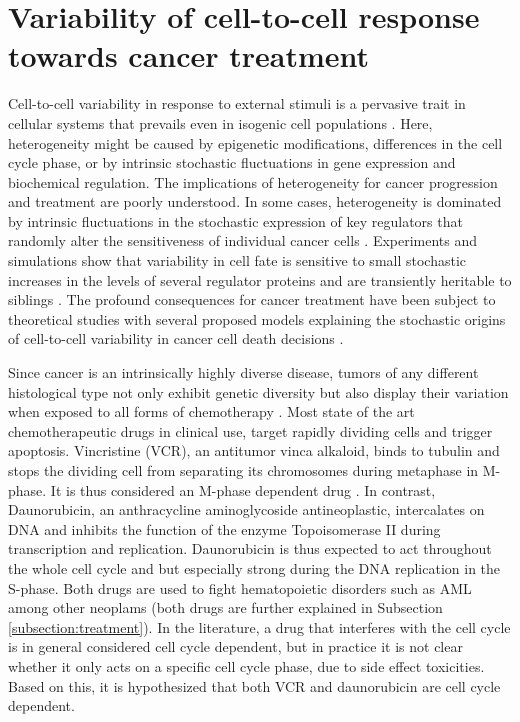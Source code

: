 \documentclass[pdftex,12pt,a4paper]{report}
\begin{document}
\section{Variability of cell-to-cell response towards cancer treatment}

Cell-to-cell variability in response to external stimuli is a pervasive trait in cellular systems that prevails even in isogenic cell populations \cite{snijder2011origins}. Here, heterogeneity might be caused by epigenetic modifications, differences in the cell cycle phase, or by intrinsic stochastic fluctuations in gene expression and biochemical regulation. The implications of heterogeneity for cancer progression and treatment are poorly understood. In some cases, heterogeneity is dominated by intrinsic fluctuations in the stochastic expression of key regulators that randomly alter the sensitiveness of individual cancer cells \cite{spencer2009non}. Experiments and simulations show that variability in cell fate is sensitive to small stochastic increases in the levels of several regulator proteins and are transiently heritable to siblings \cite{bertaux2014modeling, gaudet2012exploring}. The profound consequences for cancer treatment have been subject to theoretical studies with several proposed models explaining the stochastic origins of cell-to-cell variability in cancer cell death decisions \cite{bhola2009determinism, greene2015modeling}.

Since cancer is an intrinsically highly diverse disease, tumors of any different histological type not only exhibit genetic diversity but also display their variation when exposed to all forms of chemotherapy \cite{beroukhim2010landscape}. Most state of the art chemotherapeutic drugs in clinical use, target rapidly dividing cells and trigger apoptosis. Vincristine (VCR), an antitumor vinca alkaloid, binds to tubulin and stops the dividing cell from separating its chromosomes during metaphase in M-phase. It is thus considered an M-phase dependent drug \cite{sears2015total}. In contrast, Daunorubicin, an anthracycline aminoglycoside antineoplastic, intercalates on DNA and inhibits the function of the enzyme Topoisomerase II during transcription and replication. Daunorubicin is thus expected to act throughout the whole cell cycle and but especially strong during the DNA replication in the S-phase. Both drugs are used to fight hematopoietic disorders such as AML among other neoplams (both drugs are further explained in Subsection \ref{subsection:treatment}). In the literature, a drug that interferes with the cell cycle is in general considered cell cycle dependent, but in practice it is not clear whether it only acts on a specific cell cycle phase, due to side effect toxicities. Based on this, it is hypothesized that both VCR and daunorubicin are cell cycle dependent.
\end{document}

